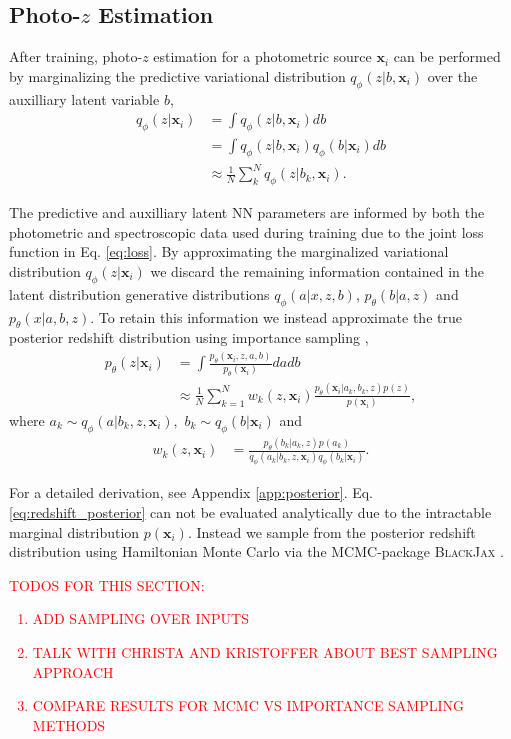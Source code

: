 \subsection{Photo-$z$ Estimation}

After training, photo-$z$ estimation for a photometric source $\mathbf{x}_i$ can be performed by marginalizing the predictive variational distribution $q_\phi(z|b,\mathbf{x}_i)$ over the auxilliary latent variable $b$,
\begin{align}
    q_\phi(z|\mathbf{x}_i) &= \int q_\phi(z|b, \mathbf{x}_i) db \\
    &= \int q_\phi(z|b,\mathbf{x}_i) q_\phi(b|\mathbf{x}_i) db \\
    &\approx \frac{1}{N} \sum_k^N q_\phi(z|b_k,\mathbf{x}_i). \label{eq:predictive_variational_dist}
\end{align}

The predictive and auxilliary latent NN parameters are informed by both the photometric and spectroscopic data used during training due to the joint loss function in Eq. \ref{eq:loss}. By approximating the marginalized variational distribution $q_\phi(z|\mathbf{x}_i)$ we discard the remaining information contained in the latent distribution generative distributions $q_\phi(a|x,z,b)$, $p_\theta(b|a,z)$ and $p_\theta(x|a,b,z)$. To retain this information we instead approximate the true posterior redshift distribution using importance sampling \cite{bishopPatternRecognitionMachine2006},
\begin{align}
    p_\theta(z|\mathbf{x}_i) &= \int \frac{p_\theta(\mathbf{x}_i, z, a, b)}{p_\theta(\mathbf{x}_i)}dadb \\
    &\approx \frac{1}{N} \sum_{k=1}^N w_k(z, \mathbf{x}_i)\frac{p_\theta(\mathbf{x}_i|a_k, b_k, z) p(z)}{p(\mathbf{x}_i)}, \label{eq:redshift_posterior}
\end{align}
where $a_k \sim q_\phi(a|b_k, z, \mathbf{x}_i),$ $ b_k \sim q_\phi(b|\mathbf{x}_i)$ and
\begin{align}
    w_k(z, \mathbf{x}_i) &= \frac{
        p_\theta(b_k| a_k, z) p(a_k) 
    }{
        q_\phi(a_k|b_k, z, \mathbf{x}_i) q_\phi(b_k|\mathbf{x}_i)
    }.
\end{align}

For a detailed derivation, see Appendix \ref{app:posterior}. Eq. \ref{eq:redshift_posterior} can not be evaluated analytically due to the intractable marginal distribution $p(\mathbf{x}_i)$. Instead we sample from the posterior redshift distribution using Hamiltonian Monte Carlo via the MCMC-package \textsc{BlackJax} \citep{blackjax2020github}.

\textcolor{red}{
TODOS FOR THIS SECTION:
\begin{enumerate}
    \item ADD SAMPLING OVER INPUTS
    \item TALK WITH CHRISTA AND KRISTOFFER ABOUT BEST SAMPLING APPROACH
    \item COMPARE RESULTS FOR MCMC VS IMPORTANCE SAMPLING METHODS
\end{enumerate}
}
